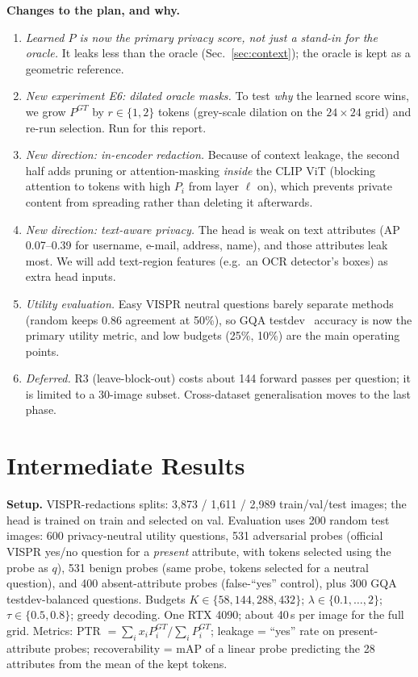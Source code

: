 \documentclass[10pt]{article}
\renewcommand{\Pr}{P}
\begin{document}
\textbf{Changes to the plan, and why.}
\begin{enumerate}
\item \emph{Learned $\Pr$ is now the primary privacy score, not just a stand-in for the oracle.} It leaks less than the oracle (Sec.~\ref{sec:context}); the oracle is kept as a geometric reference.
\item \emph{New experiment E6: dilated oracle masks.} To test \emph{why} the learned score wins, we grow $\Pr^{GT}$ by $r\in\{1,2\}$ tokens (grey-scale dilation on the $24{\times}24$ grid) and re-run selection. Run for this report.
\item \emph{New direction: in-encoder redaction.} Because of context leakage, the second half adds pruning or attention-masking \emph{inside} the CLIP ViT (blocking attention to tokens with high $\Pr_i$ from layer $\ell$ on), which prevents private content from spreading rather than deleting it afterwards.
\item \emph{New direction: text-aware privacy.} The head is weak on text attributes (AP 0.07--0.39 for username, e-mail, address, name), and those attributes leak most. We will add text-region features (e.g.\ an OCR detector's boxes) as extra head inputs.
\item \emph{Utility evaluation.} Easy VISPR neutral questions barely separate methods (random keeps 0.86 agreement at 50\%), so GQA testdev~\cite{hudson2019gqa} accuracy is now the primary utility metric, and low budgets (25\%, 10\%) are the main operating points.
\item \emph{Deferred.} R3 (leave-block-out) costs about 144 forward passes per question; it is limited to a 30-image subset. Cross-dataset generalisation moves to the last phase.
\end{enumerate}

\section{Intermediate Results}
\textbf{Setup.} VISPR-redactions splits: 3,873 / 1,611 / 2,989 train/val/test images; the head is trained on train and selected on val. Evaluation uses 200 random test images:
600 privacy-neutral utility questions, 531 adversarial probes (official VISPR yes/no question for a \emph{present} attribute, with tokens selected using the probe as $q$),
531 benign probes (same probe, tokens selected for a neutral question), and 400 absent-attribute probes (false-``yes'' control), plus 300 GQA testdev-balanced questions.
Budgets $K\in\{58,144,288,432\}$; $\lambda\in\{0.1,\dots,2\}$; $\tau\in\{0.5,0.8\}$; greedy decoding. One RTX 4090; about 40\,s per image for the full grid.
Metrics: PTR $=\sum_i x_i\Pr^{GT}_i/\sum_i\Pr^{GT}_i$; leakage = ``yes'' rate on present-attribute probes; recoverability = mAP of a linear probe predicting the 28 attributes from the mean of the kept tokens.
\end{document}
